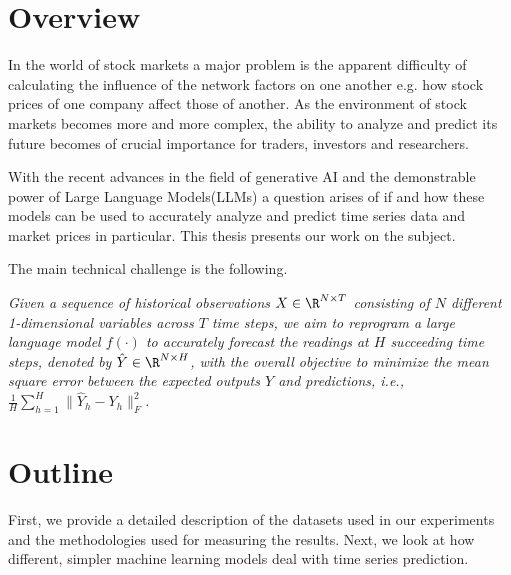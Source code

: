 \section{Overview}
In the world of stock markets a major problem is the apparent difficulty of calculating the influence of the network factors on one another e.g. how stock prices of one company affect those of another. As the environment of stock markets becomes more and more complex, the ability to analyze and predict its future becomes of crucial importance for traders, investors and researchers.

With the recent advances in the field of generative AI and the demonstrable power of Large Language Models(LLMs) a question arises of if and how these models can be used to accurately analyze and predict time series data and market prices in particular. This thesis presents our work on the subject.

The main technical challenge is the following.

\textit{Given a sequence of historical observations \(X \in \R^{N\times T}\)
	consisting of \(N\) different 1-dimensional variables across \(T\) time steps, we aim to reprogram a large
	language model \(f(\cdot)\) to accurately forecast the readings at \(H\) succeeding time steps, denoted by \(\hat{Y} \in \R^{N\times H}\),
	with the overall objective to minimize the mean square error between the expected outputs \(Y\) and predictions, i.e., \(\frac1H \sum_{h=1}^H \| \hat{Y}_h - Y_h \|_F^2 \).} \cite{reprogramming_llm}

\section{Outline} %
First, we provide a detailed description of the datasets used in our experiments and the methodologies used for measuring the results.
Next, we look at how different, simpler machine learning models deal with time series prediction.


